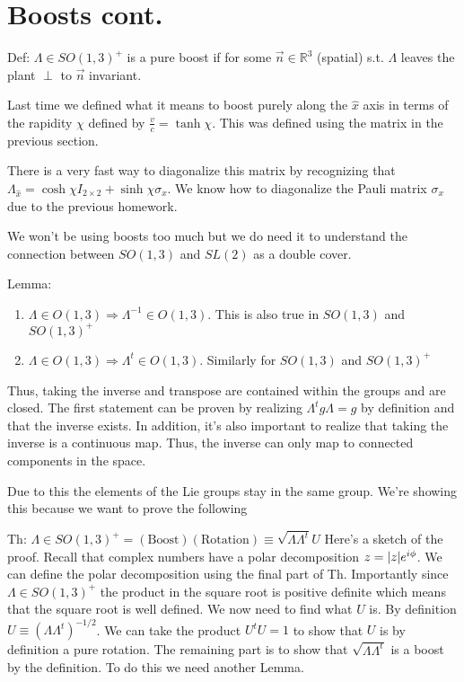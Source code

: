 \section{Boosts cont.}
Def: $\Lambda \in SO(1,3)^+$ is a pure boost if for some $\vec{n}\in \mathbb{R}^3$
(spatial) s.t. $\Lambda$ leaves the plant $\perp$ to $\vec{n}$ invariant.

Last time we defined what it means to boost purely along the $\hat{x}$ axis
in terms of the rapidity $\chi$ defined by $\frac{v}{c} = \tanh \chi$. This
was defined using the matrix in the previous section.

There is a very fast way to diagonalize this matrix by recognizing that
$\Lambda_{\hat{x}} = \cosh \chi I_{2\times 2} + \sinh \chi \sigma_x$.
We know how to diagonalize the Pauli matrix $\sigma_x$ due to the previous
homework.

We won't be using boosts too much but we do need it to understand the connection
between $SO(1, 3)$ and $SL(2)$ as a double cover.

Lemma:
\begin{enumerate}
    \item $\Lambda \in O(1, 3) \Rightarrow \Lambda^{-1} \in O(1,3)$. This is also
        true in $SO(1,3)$ and $SO(1,3)^+$
    \item $\Lambda \in O(1, 3) \Rightarrow \Lambda^t \in O(1,3)$. Similarly for
        $SO(1,3)$ and $SO(1,3)^+$
\end{enumerate}
Thus, taking the inverse and transpose are contained within the groups and are closed.
The first statement can be proven by realizing $\Lambda^t g \Lambda = g$ by definition
and that the inverse exists. In addition, it's also important to realize that taking
the inverse is a continuous map. Thus, the inverse can only map to connected components
in the space. 

Due to this the elements of the Lie groups stay in the same group. We're showing this
because we want to prove the following

Th: $\Lambda \in SO(1, 3)^+ = (\text{Boost})(\text{Rotation}) \equiv \sqrt{\Lambda \Lambda^t} U$
Here's a sketch of the proof. Recall that complex numbers have a polar decomposition
$z = \abs*{z} e^{i \phi}$. We can define the polar decomposition using the final part of Th.
Importantly since $\Lambda \in SO(1,3)^+$ the product in the square root is positive
definite which means that the square root is well defined. We now need to find what
$U$ is. By definition $U \equiv \left(\Lambda \Lambda^t\right)^{-1/2}$. We can
take the product $U^t U = 1$ to show that $U$ is by definition a pure rotation.
The remaining part is to show that $\sqrt{\Lambda \Lambda^t}$ is a boost by
the definition. To do this we need another Lemma.

